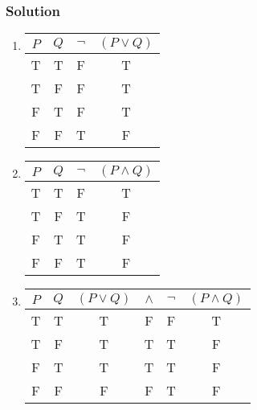 \subsubsection*{Solution}
\begin{enumerate}
	\item \hspace{1em}
	
    \begin{center}
    	\begin{tabular}{cc|cc}
    		$P$ & $Q$ & $\neg$ & $(P \lor Q)$ \\
    		\hline
    		T & T & \color{red}F & T\\
    		T & F & \color{red}F & T\\
    		F & T & \color{red}F & T\\
    		F & F & \color{red}T & F\\
    	\end{tabular}
    \end{center}
    
	\item  \hspace{1em}

    \begin{center}
    	\begin{tabular}{cc|cc}
    		$P$ & $Q$ & $\neg$ & $(P \land Q)$ \\
    		\hline
    		T & T & \color{red}F & T\\
    		T & F & \color{red}T & F\\
    		F & T & \color{red}T & F\\
    		F & F & \color{red}T & F\\
    	\end{tabular}
    \end{center}
    
	\item  \hspace{1em}

    \begin{center}
    	\begin{tabular}{cc|cccc}
    		$P$ & $Q$ & $(P \lor Q) $ & $\land$ & $\neg$ & $(P \land Q)$ \\
    		\hline
    		T & T & T & \color{red}F & F & T\\
    		T & F & T & \color{red}T & T & F\\
    		F & T & T & \color{red}T & T & F\\
    		F & F & F & \color{red}F & T & F\\
    	\end{tabular}
    \end{center}
    

\end{enumerate}
